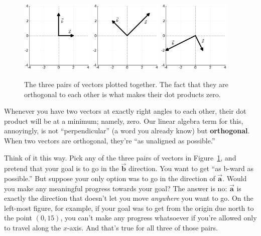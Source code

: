 \begin{figure}[ht]
\centering
\includegraphics[width=0.31\textwidth]{dotProduct1.png}
\includegraphics[width=0.31\textwidth]{dotProduct2.png}
\includegraphics[width=0.31\textwidth]{dotProduct3.png}
\caption{The three pairs of vectors plotted together. The fact that they are
orthogonal to each other is what makes their dot products zero.}
\label{fig:allTogether}
\end{figure}

Whenever you have two vectors at exactly right angles to each other, their dot
product will be at a minimum; namely, zero. Our linear algebra term for this,
annoyingly, is not ``perpendicular'' (a word you already know) but
\textbf{orthogonal}. When two vectors are orthogonal, they're ``as unaligned as
possible.''

Think of it this way. Pick any of the three pairs of vectors in
Figure~\ref{fig:allTogether}, and pretend that your goal is to go in the
$\overrightarrow{\textbf{b}}$ direction. You want to get ``as b-ward as
possible.'' But suppose your only option was to go in the direction of
$\overrightarrow{\textbf{a}}$. Would you make any meaningful progress towards
your goal? The answer is no: $\overrightarrow{\textbf{a}}$ is exactly the
direction that doesn't let you move \textit{anywhere} you want to go. On the
left-most figure, for example, if your goal was to get from the origin due
north to the point $(0,15)$, you can't make any progress whatsoever if you're
allowed only to travel along the $x$-axis. And that's true for all three of
those pairs.

